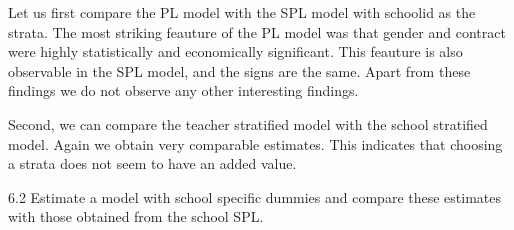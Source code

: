 \documentclass[
]{article}
\begin{document}
Let us first compare the PL model with the SPL model with schoolid as
the strata. The most striking feauture of the PL model was that gender
and contract were highly statistically and economically significant.
This feauture is also observable in the SPL model, and the signs are the
same. Apart from these findings we do not observe any other interesting
findings.

Second, we can compare the teacher stratified model with the school
stratified model. Again we obtain very comparable estimates. This
indicates that choosing a strata does not seem to have an added value.
\clearpage

6.2 Estimate a model with school specific dummies and compare these
estimates with those obtained from the school SPL.

\begin{table}[!h]


\end{table}
\end{document}
